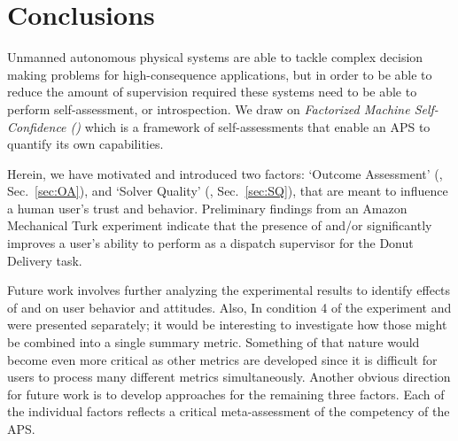 \section{Conclusions} \label{sec:conclusions}
Unmanned autonomous physical systems are able to tackle complex decision making problems for high-consequence applications, but in order to be able to reduce the amount of supervision required these systems need to be able to perform self-assessment, or introspection. We draw on \emph{Factorized Machine Self-Confidence (\famsec)} which is a framework of self-assessments that enable an APS to quantify its own capabilities.

Herein, we have motivated and introduced two \famsec{} factors: `Outcome Assessment' (\xP{}, Sec.~\ref{sec:OA}), and `Solver Quality' (\xQ{}, Sec.~\ref{sec:SQ}), that are meant to influence a human user's trust and behavior. Preliminary findings from an Amazon Mechanical Turk experiment indicate that the presence of \xQ{} and/or \xP{} significantly improves a user's ability to perform as a dispatch supervisor for the Donut Delivery task.

Future work involves further analyzing the experimental results to identify effects of \xQ{} and \xP{} on user behavior and attitudes. Also, In condition 4 of the experiment \xQ{} and \xP{} were presented separately; it would be interesting to investigate how those might be combined into a single summary metric. Something of that nature would become even more critical as other \famsec{} metrics are developed since it is difficult for users to process many different metrics simultaneously. Another obvious direction for future work is to develop approaches for the remaining three \famsec{} factors. Each of the individual factors reflects a critical meta-assessment of the competency of the APS.

